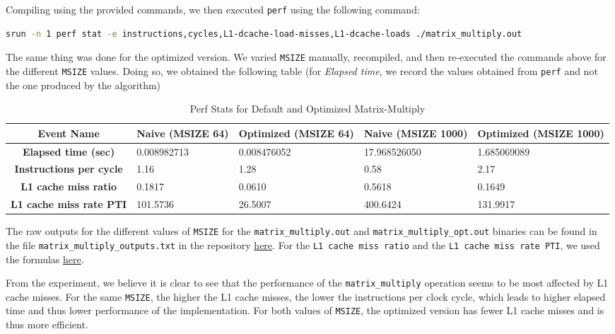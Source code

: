 \documentclass[a4paper,10pt]{article}
\begin{document}
Compiling using the provided commands, we then executed \verb|perf| using the following command: 
\begin{lstlisting}[language=bash,basicstyle=\tiny\ttfamily]
srun -n 1 perf stat -e instructions,cycles,L1-dcache-load-misses,L1-dcache-loads ./matrix_multiply.out
\end{lstlisting}
The same thing was done for the optimized version. We varied \verb|MSIZE| manually, recompiled, and then re-executed the commands above for the different \verb|MSIZE| values. 
Doing so, we obtained the following table (for \textit{Elapsed time}, we record the values obtained from \verb|perf| and not the one produced by the algorithm) 
\begin{table}[h!]
\centering
\begin{tabular}{|c|p{2.5cm}|p{2.5cm}|p{2.5cm}|p{2.5cm}|}
\hline
\textbf{Event Name} & \textbf{Naive (MSIZE 64)} & \textbf{Optimized (MSIZE 64)} & \textbf{Naive (MSIZE 1000)} & \textbf{Optimized (MSIZE 1000)} \\
\hline
\textbf{Elapsed time (sec)} & 0.008982713 & 0.008476052 & 17.968526050 & 1.685069089 \\
\hline
\textbf{Instructions per cycle} & 1.16 & 1.28 & 0.58 & 2.17 \\
\hline
\textbf{L1 cache miss ratio} & 0.1817 & 0.0610 & 0.5618 & 0.1649 \\
\hline
\textbf{L1 cache miss rate PTI} & 101.5736 & 26.5007 & 400.6424 & 131.9917  \\
\hline
\end{tabular}
\caption{Perf Stats for Default and Optimized Matrix-Multiply}
\end{table}
The raw outputs for the different values of \verb|MSIZE| for the \verb|matrix_multiply.out| and \verb|matrix_multiply_opt.out| binaries can be found in the file \verb|matrix_multiply_outputs.txt| in the repository \href{https://github.com/paulmyr/DD2356-MethodsHPC/blob/master/2_hpc_arch_perf_model/exercise4/matrix_multiply_outputs.txt}{here}. For the \verb|L1 cache miss ratio| and the \verb|L1 cache miss rate PTI|, we used the formulas \href{https://canvas.kth.se/courses/53216/pages/tutorial-the-perf-tool?module_item_id=1067474}{here}.

From the experiment, we believe it is clear to see that the performance of the \verb|matrix_multiply| operation seems to be most affected by L1 cache misses. For the same \verb|MSIZE|, the higher the L1 cache misses, the lower the instructions per clock cycle, which leads to higher elapsed time and thus lower performance of the implementation. For both values of \verb|MSIZE|, the optimized version has fewer L1 cache misses and is thus more efficient.  
\end{document}

